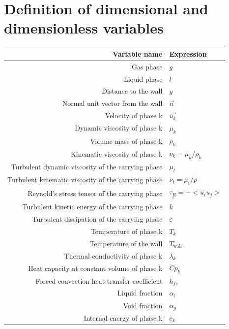 \documentclass[a4paper,12pt]{report}
\begin{document}
\tableofcontents

\pagebreak

\section*{Definition of dimensional and dimensionless variables}
\begin{center}
\begin{tabular}{|r|l|}
	\hline Variable name & Expression \\ \hline \hline
	Gas phase & $g$ \\ \hline
	Liquid phase & $l$ \\ \hline
	Distance to the wall & $y$ \\ \hline
	Normal unit vector from the wall & $\overrightarrow{n}$ \\ \hline
	Velocity of phase k & $\overrightarrow{u_k}$\\ \hline
	Dynamic viscosity of phase k
		& $\mu_k $ \\ \hline
	Volume mass of phase k
		& $\rho_k$ \\ \hline
	Kinematic viscosity of phase k
		& $\nu_k = \mu_k/\rho_k$ \\ \hline
	Turbulent dynamic viscosity of the carrying phase
		& $\mu_{t} $ \\ \hline
	Turbulent kinematic viscosity of the carrying phase
		& $\nu_t = \mu_t/\rho$ \\ \hline
	Reynold's stress tensor of the carrying phase
		& $\underline{\underline{\tau_R}} = - <u_iu_j>$ \\ \hline
	Turbulent kinetic energy of the carrying phase
		& $k$ \\ \hline
	Turbulent dissipation of the carrying phase
		& $\varepsilon$ \\ \hline
	Temperature of phase k
		& $T_{k}$ \\ \hline
	Temperature of the wall
		& $T_\text{wall}$ \\ \hline
	Thermal conductivity of phase k
		& $\lambda_k $ \\ \hline
	Heat capacity at constant volume of phase k
		& $Cp_k$ \\ \hline
	Forced convection heat transfer coefficient
		& $h_{fc}$	\\ \hline
	Liquid fraction
		& $\alpha_l $ \\ \hline
	Void fraction
		& $\alpha_g $ \\ \hline
	Internal energy of phase k
		& $e_k $ \\ \hline

\end{tabular}
\end{center}
\end{document}
